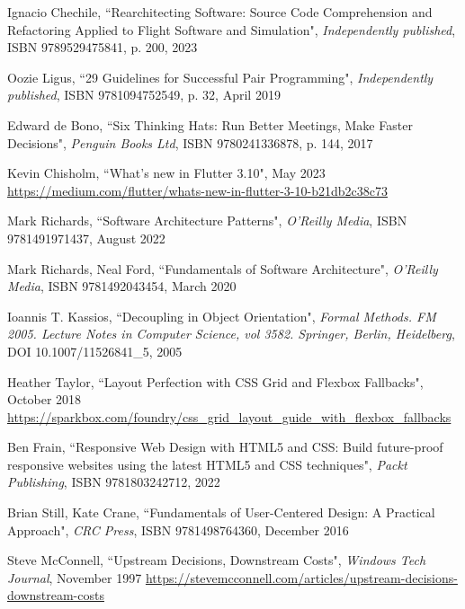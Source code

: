 \begin{thebibliography}{100}
 Ignacio Chechile, ``Rearchitecting Software: Source Code Comprehension and Refactoring 
Applied to Flight Software and Simulation", \emph{Independently published}, ISBN 9789529475841, p. 200, 2023

 Oozie Ligus, ``29 Guidelines for Successful Pair Programming", \emph{Independently published},
ISBN 9781094752549, p. 32,  April 2019

 Edward de Bono, ``Six Thinking Hats: Run Better Meetings, Make Faster Decisions",
\emph{Penguin Books Ltd}, ISBN 9780241336878, p. 144, 2017

 Kevin Chisholm, ``What's new in Flutter 3.10", May 2023
\href{https://medium.com/flutter/whats-new-in-flutter-3-10-b21db2c38c73}{https://medium.com/flutter/whats-new-in-flutter-3-10-b21db2c38c73}

 Mark Richards, ``Software Architecture Patterns", 
\emph{O'Reilly Media}, ISBN 9781491971437, August 2022

 Mark Richards, Neal Ford, ``Fundamentals of Software Architecture",
\emph{O'Reilly Media}, ISBN 9781492043454, March 2020  

 Ioannis T. Kassios, ``Decoupling in Object Orientation", \emph{Formal Methods. FM 2005. 
Lecture Notes in Computer Science, vol 3582. Springer, Berlin, Heidelberg}, DOI 10.1007/11526841\_5, 2005

 Heather Taylor, ``Layout Perfection with CSS Grid and Flexbox Fallbacks", October 2018
\href{https://sparkbox.com/foundry/css_grid_layout_guide_with_flexbox_fallbacks}{https://sparkbox.com/foundry/css\_grid\_layout\_guide\_with\_flexbox\_fallbacks}

 Ben Frain, ``Responsive Web Design with HTML5 and CSS: Build future-proof responsive 
websites using the latest HTML5 and CSS techniques", \emph{Packt Publishing}, ISBN 9781803242712, 2022

 Brian Still, Kate Crane, ``Fundamentals of User-Centered Design: A Practical Approach", 
\emph{CRC Press}, ISBN 9781498764360, December 2016

 Steve McConnell, ``Upstream Decisions, Downstream Costs", \emph{Windows Tech Journal}, November 1997
\href{https://stevemcconnell.com/articles/upstream-decisions-downstream-costs}{https://stevemcconnell.com/articles/upstream-decisions-downstream-costs}


\end{thebibliography}
